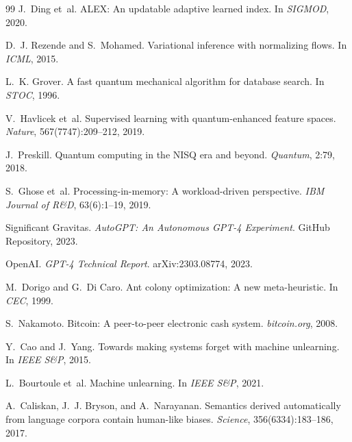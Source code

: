﻿\documentclass[12pt,a4paper]{article}
\begin{document}
\begin{thebibliography}{99}
J.~Ding et~al.
\newblock ALEX: An updatable adaptive learned index.
\newblock In \textit{SIGMOD}, 2020.

D.~J. Rezende and S.~Mohamed.
\newblock Variational inference with normalizing flows.
\newblock In \textit{ICML}, 2015.

L.~K. Grover.
\newblock A fast quantum mechanical algorithm for database search.
\newblock In \textit{STOC}, 1996.

V.~Havlicek et~al.
\newblock Supervised learning with quantum-enhanced feature spaces.
\newblock \textit{Nature}, 567(7747):209--212, 2019.

J.~Preskill.
\newblock Quantum computing in the NISQ era and beyond.
\newblock \textit{Quantum}, 2:79, 2018.

S.~Ghose et~al.
\newblock Processing-in-memory: A workload-driven perspective.
\newblock \textit{IBM Journal of R\&D}, 63(6):1--19, 2019.

Significant Gravitas.
\newblock \textit{AutoGPT: An Autonomous GPT-4 Experiment}.
\newblock GitHub Repository, 2023.

OpenAI.
\newblock \textit{GPT-4 Technical Report}.
\newblock arXiv:2303.08774, 2023.

M.~Dorigo and G.~Di Caro.
\newblock Ant colony optimization: A new meta-heuristic.
\newblock In \textit{CEC}, 1999.

S.~Nakamoto.
\newblock Bitcoin: A peer-to-peer electronic cash system.
\newblock \textit{bitcoin.org}, 2008.

Y.~Cao and J.~Yang.
\newblock Towards making systems forget with machine unlearning.
\newblock In \textit{IEEE S\&P}, 2015.

L.~Bourtoule et~al.
\newblock Machine unlearning.
\newblock In \textit{IEEE S\&P}, 2021.

A.~Caliskan, J.~J. Bryson, and A.~Narayanan.
\newblock Semantics derived automatically from language corpora contain
  human-like biases.
\newblock \textit{Science}, 356(6334):183--186, 2017.


\end{thebibliography}
\end{document}
